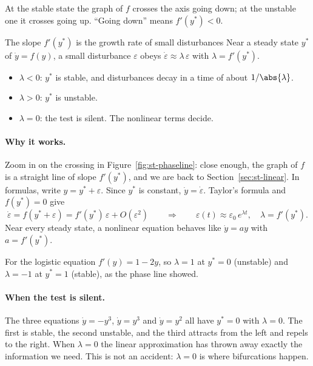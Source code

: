At the stable state the graph of $f$ crosses the axis going down; at the
unstable one it crosses going up. ``Going down'' means $f'(y^*) < 0$.

\begin{gbox}{The slope $f'(y^*)$ is the growth rate of small disturbances}\label{sec:st-slopetest}
%
Near a steady state $y^*$ of $\dot y = f(y)$, a small disturbance $\varepsilon$
obeys $\dot\varepsilon \approx \lambda\,\varepsilon$ with $\lambda = f'(y^*)$.
\begin{itemize}
  \item $\lambda < 0$: $y^*$ is stable, and disturbances decay in a time of about
        $1/\abs{\lambda}$.
  \item $\lambda > 0$: $y^*$ is unstable.
  \item $\lambda = 0$: the test is silent. The nonlinear terms decide.
\end{itemize}
\end{gbox}

\paragraph{Why it works.}
Zoom in on the crossing in Figure~\ref{fig:st-phaseline}: close enough, the
graph of $f$ is a straight line of slope $f'(y^*)$, and we are back to
Section~\ref{sec:st-linear}. In formulas, write $y = y^* + \varepsilon$. Since
$y^*$ is constant, $\dot y = \dot\varepsilon$. Taylor's formula and $f(y^*) = 0$ give
\begin{equation}\label{eq:st-linearization}
  \dot\varepsilon = f(y^* + \varepsilon)
  = f'(y^*)\,\varepsilon + O(\varepsilon^2)
  \qquad\Longrightarrow\qquad
  \varepsilon(t) \approx \varepsilon_0\,e^{\lambda t}, \quad \lambda = f'(y^*).
\end{equation}
Near every steady state, a nonlinear equation behaves like $\dot y = ay$ with
$a = f'(y^*)$.

For the logistic equation $f'(y) = 1 - 2y$, so $\lambda = 1$ at $y^* = 0$
(unstable) and $\lambda = -1$ at $y^* = 1$ (stable), as the phase line showed.

\paragraph{When the test is silent.}
The three equations $\dot y = -y^3$, $\dot y = y^3$ and $\dot y = y^2$ all have
$y^* = 0$ with $\lambda = 0$. The first is stable, the second unstable, and the
third attracts from the left and repels to the right. When $\lambda = 0$ the
linear approximation has thrown away exactly the information we need. This is
not an accident: $\lambda = 0$ is where bifurcations happen.


